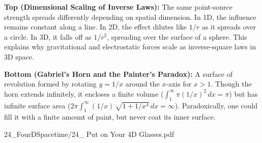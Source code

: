 \begin{SideNotePage}{
  \textbf{Top (Dimensional Scaling of Inverse Laws):}  
  The same point-source strength spreads differently depending on spatial dimension. In 1D, the influence remains constant along a line. In 2D, the effect dilutes like $1/r$ as it spreads over a circle. In 3D, it falls off as $1/r^2$, spreading over the surface of a sphere. This explains why gravitational and electrostatic forces scale as inverse-square laws in 3D space. \par

  \textbf{Bottom (Gabriel’s Horn and the Painter’s Paradox):}  
  A surface of revolution formed by rotating $y = 1/x$ around the $x$-axis for $x > 1$. Though the horn extends infinitely, it encloses a finite volume ($\int_1^\infty \pi (1/x)^2\,dx = \pi$) but has infinite surface area ($2\pi \int_1^\infty (1/x)\, \sqrt{1 + 1/x^{4}}\,dx = \infty$). Paradoxically, one could \QSOpen{}fill\QSClose{} it with a finite amount of paint, but never coat its inner surface. \par

}{24_FourDSpacetime/24_ Put on Your 4D Glasses.pdf}
\end{SideNotePage}
